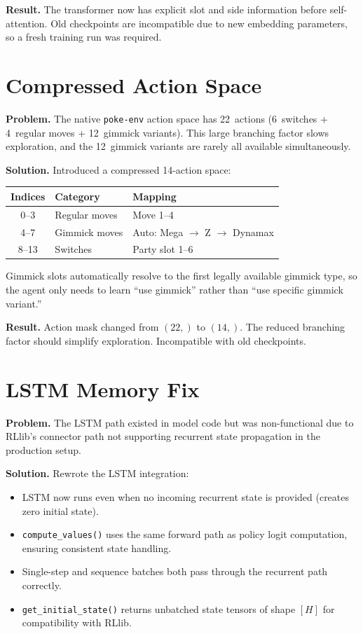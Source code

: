 \textbf{Result.} The transformer now has explicit slot and side information
before self-attention.  Old checkpoints are incompatible due to new embedding
parameters, so a fresh training run was required.

\section{Compressed Action Space}

\textbf{Problem.} The native \texttt{poke-env} action space has 22~actions
(6~switches + 4~regular moves + 12~gimmick variants).  This large branching
factor slows exploration, and the 12~gimmick variants are rarely all available
simultaneously.

\textbf{Solution.} Introduced a compressed 14-action space:

\begin{center}
\small
\begin{tabularx}{0.7\textwidth}{c l l}
  \toprule
  \textbf{Indices} & \textbf{Category} & \textbf{Mapping} \\
  \midrule
  0--3  & Regular moves & Move 1--4 \\
  4--7  & Gimmick moves & Auto: Mega $\to$ Z $\to$ Dynamax \\
  8--13 & Switches      & Party slot 1--6 \\
  \bottomrule
\end{tabularx}
\end{center}

Gimmick slots automatically resolve to the first legally available gimmick
type, so the agent only needs to learn ``use gimmick'' rather than ``use
specific gimmick variant.''

\textbf{Result.} Action mask changed from $(22,)$ to $(14,)$.  The reduced
branching factor should simplify exploration.  Incompatible with old
checkpoints.

\section{LSTM Memory Fix}

\textbf{Problem.} The LSTM path existed in model code but was non-functional
due to RLlib's connector path not supporting recurrent state propagation in
the production setup.

\textbf{Solution.} Rewrote the LSTM integration:
\begin{itemize}
  \item LSTM now runs even when no incoming recurrent state is provided
        (creates zero initial state).
  \item \texttt{compute\_values()} uses the same forward path as policy logit
        computation, ensuring consistent state handling.
  \item Single-step and sequence batches both pass through the recurrent path
        correctly.
  \item \texttt{get\_initial\_state()} returns unbatched state tensors of shape
        $[H]$ for compatibility with RLlib.
\end{itemize}

